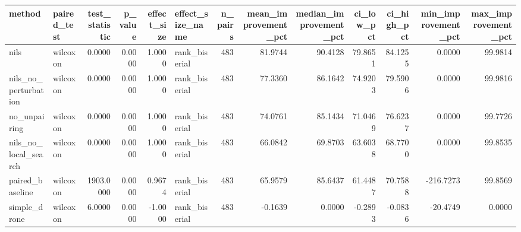 \begin{tabular}{llrrrlrrrrrrr}
\toprule
method & paired_test & test_statistic & p_value & effect_size & effect_size_name & n_pairs & mean_improvement_pct & median_improvement_pct & ci_low_pct & ci_high_pct & min_improvement_pct & max_improvement_pct \\
\midrule
nils & wilcoxon & 0.0000 & 0.0000 & 1.0000 & rank_biserial & 483 & 81.9744 & 90.4128 & 79.8651 & 84.1255 & 0.0000 & 99.9814 \\
nils_no_perturbation & wilcoxon & 0.0000 & 0.0000 & 1.0000 & rank_biserial & 483 & 77.3360 & 86.1642 & 74.9203 & 79.5906 & 0.0000 & 99.9816 \\
no_unpairing & wilcoxon & 0.0000 & 0.0000 & 1.0000 & rank_biserial & 483 & 74.0761 & 85.1434 & 71.0469 & 76.6237 & 0.0000 & 99.7726 \\
nils_no_local_search & wilcoxon & 0.0000 & 0.0000 & 1.0000 & rank_biserial & 483 & 66.0842 & 69.8703 & 63.6038 & 68.7700 & 0.0000 & 99.8535 \\
paired_baseline & wilcoxon & 1903.0000 & 0.0000 & 0.9674 & rank_biserial & 483 & 65.9579 & 85.6437 & 61.4487 & 70.7588 & -216.7273 & 99.8569 \\
simple_drone & wilcoxon & 6.0000 & 0.0000 & -1.0000 & rank_biserial & 483 & -0.1639 & 0.0000 & -0.2893 & -0.0836 & -20.4749 & 0.0000 \\
\bottomrule
\end{tabular}

